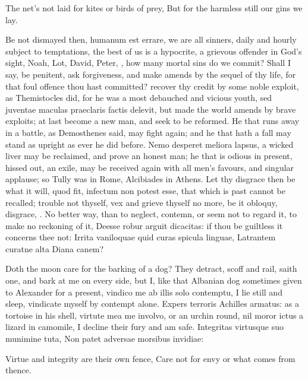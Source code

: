 {The net's not laid for kites or birds of prey,
But for the harmless still our gins we lay.

Be not dismayed then, humanum est errare, we are all sinners, daily and
hourly subject to temptations, the best of us is a hypocrite, a
grievous offender in God's sight, Noah, Lot, David, Peter, \etc{}, how
many mortal sins do we commit? Shall I say, be penitent, ask
forgiveness, and make amends by the sequel of thy life, for that foul
offence thou hast committed? recover thy credit by some noble exploit,
as Themistocles did, for he was a most debauched and vicious youth, sed
juventae maculas praeclaris factis delevit, but made the world amends
by brave exploits; at last become a new man, and seek to be reformed.
He that runs away in a battle, as Demosthenes said, may fight again;
and he that hath a fall may stand as upright as ever he did before.
Nemo desperet meliora lapsus, a wicked liver may be reclaimed, and
prove an honest man; he that is odious in present, hissed out, an
exile, may be received again with all men's favours, and singular
applause; so Tully was in Rome, Alcibiades in Athens. Let thy disgrace
then be what it will, quod fit, infectum non potest esse, that which is
past cannot be recalled; trouble not thyself, vex and grieve thyself no
more, be it obloquy, disgrace, \etc{}. No better way, than to neglect,
contemn, or seem not to regard it, to make no reckoning of it, Deesse
robur arguit dicacitas: if thou be guiltless it concerns thee not:
Irrita vaniloquae quid curas spicula linguae,
Latrantem curatne alta Diana canem?

Doth the moon care for the barking of a dog? They detract, scoff and
rail, saith one, and bark at me on every side, but I, like that
Albanian dog sometimes given to Alexander for a present, vindico me ab
illis solo contemptu, I lie still and sleep, vindicate myself by
contempt alone. Expers terroris Achilles armatus: as a tortoise
in his shell, virtute mea me involvo, or an urchin round, nil
moror ictus a lizard in camomile, I decline their fury and am
safe.
Integritas virtusque suo munimine tuta,
Non patet adversae morsibus invidiae:

Virtue and integrity are their own fence,
Care not for envy or what comes from thence.

}
